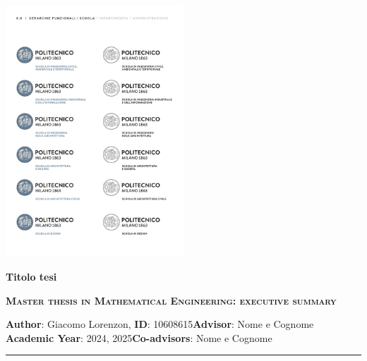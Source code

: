
\thispagestyle{firstpage}

\includegraphics[width=0.5\textwidth]{0_front/logo.pdf}\hfill \\
{\Large \bfseries Titolo tesi\par}
{\large \bfseries \textsc{Master thesis in Mathematical Engineering: executive summary\hfill} \par}
\begin{spacing}{0.85}
{
    \footnotesize
    \textbf{Author}: Giacomo Lorenzon, \textbf{ID}: 10608615\hfill\textbf{Advisor}: Nome e Cognome\\
    \textbf{Academic Year}: 2024, 2025\hfill\textbf{Co-advisors}: Nome e Cognome\\
    \rule{\textwidth}{0.5pt}
}
\end{spacing}
\vspace{-0.5cm}